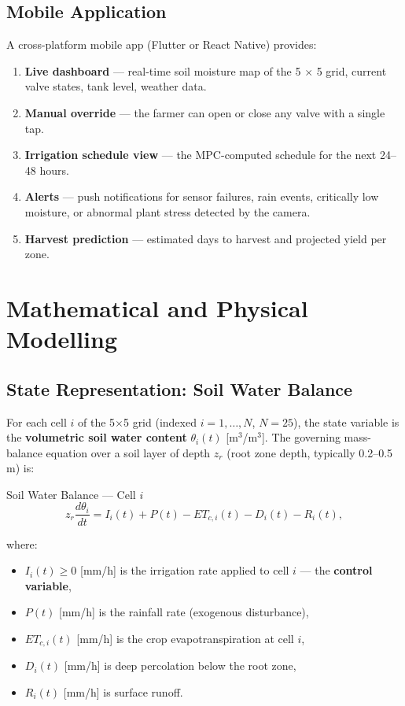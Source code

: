 \documentclass[12pt, a4paper]{report}
\begin{document}
\section{Mobile Application}

A cross-platform mobile app (Flutter or React Native) provides:
\begin{enumerate}[leftmargin=2em]
  \item \textbf{Live dashboard} — real-time soil moisture map of the 5 $\times$ 5 grid, current valve states, tank level, weather data.
  \item \textbf{Manual override} — the farmer can open or close any valve with a single tap.
  \item \textbf{Irrigation schedule view} — the MPC-computed schedule for the next 24–48 hours.
  \item \textbf{Alerts} — push notifications for sensor failures, rain events, critically low moisture, or abnormal plant stress detected by the camera.
  \item \textbf{Harvest prediction} — estimated days to harvest and projected yield per zone.
\end{enumerate}

\chapter{Mathematical and Physical Modelling}
\label{chap:math}

\section{State Representation: Soil Water Balance}

For each cell $i$ of the 5$\times$5 grid (indexed $i = 1, \ldots, N$, $N=25$), the state variable is the \textbf{volumetric soil water content} $\theta_i(t)$ [m$^3$/m$^3$]. The governing mass-balance equation over a soil layer of depth $z_r$ (root zone depth, typically 0.2–0.5 m) is:

\begin{mathbox}{Soil Water Balance — Cell $i$}
\begin{equation}
  z_r \frac{d\theta_i}{dt} = I_i(t) + P(t) - ET_{c,i}(t) - D_i(t) - R_i(t),
  \label{eq:water_balance}
\end{equation}
\end{mathbox}

\noindent where:
\begin{itemize}[leftmargin=2em]
  \item $I_i(t) \geq 0$ [mm/h] is the irrigation rate applied to cell $i$ — the \textbf{control variable},
  \item $P(t)$ [mm/h] is the rainfall rate (exogenous disturbance),
  \item $ET_{c,i}(t)$ [mm/h] is the crop evapotranspiration at cell $i$,
  \item $D_i(t)$ [mm/h] is deep percolation below the root zone,
  \item $R_i(t)$ [mm/h] is surface runoff.
\end{itemize}
\end{document}
